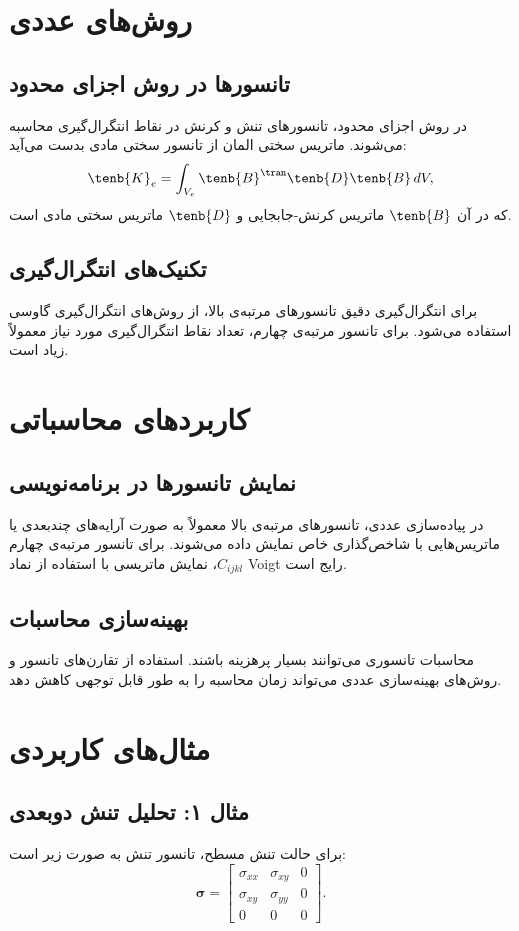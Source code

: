 \section{روش‌های عددی}

\subsection{تانسورها در روش اجزای محدود}
در روش اجزای محدود، تانسورهای تنش و کرنش در نقاط انتگرال‌گیری محاسبه می‌شوند. ماتریس سختی المان از تانسور سختی مادی بدست می‌آید:
\begin{equation}
    \tenb{K}_e = \int_{V_e} \tenb{B}^\tran \tenb{D} \tenb{B} \, dV,
\end{equation}
که در آن $\tenb{B}$ ماتریس کرنش-جابجایی و $\tenb{D}$ ماتریس سختی مادی است.

\subsection{تکنیک‌های انتگرال‌گیری}
برای انتگرال‌گیری دقیق تانسورهای مرتبه‌ی بالا، از روش‌های انتگرال‌گیری گاوسی استفاده می‌شود. برای تانسور مرتبه‌ی چهارم، تعداد نقاط انتگرال‌گیری مورد نیاز معمولاً زیاد است.

\section{کاربردهای محاسباتی}

\subsection{نمایش تانسورها در برنامه‌نویسی}
در پیاده‌سازی عددی، تانسورهای مرتبه‌ی بالا معمولاً به صورت آرایه‌های چندبعدی یا ماتریس‌هایی با شاخص‌گذاری خاص نمایش داده می‌شوند. برای تانسور مرتبه‌ی چهارم $C_{ijkl}$، نمایش ماتریسی با استفاده از نماد Voigt رایج است.

\subsection{بهینه‌سازی محاسبات}
محاسبات تانسوری می‌توانند بسیار پرهزینه باشند. استفاده از تقارن‌های تانسور و روش‌های بهینه‌سازی عددی می‌تواند زمان محاسبه را به طور قابل توجهی کاهش دهد.

\section{مثال‌های کاربردی}

\subsection{مثال ۱: تحلیل تنش دوبعدی}
برای حالت تنش مسطح، تانسور تنش به صورت زیر است:
\begin{equation}
    \boldsymbol{\sigma} = \begin{bmatrix}
        \sigma_{xx} & \sigma_{xy} & 0 \\
        \sigma_{xy} & \sigma_{yy} & 0 \\
        0           & 0           & 0
    \end{bmatrix}.
\end{equation}

